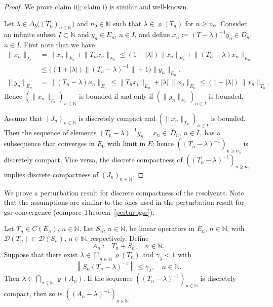 \documentclass[a4paper,reqno]{amsart}
\begin{document}
\begin{proof}
We prove claim ii); claim i) is similar and well-known.

Let $\lambda\in\Delta_b\big((T_n)_{n\in{\mathbb{N}}}\big)$ and $n_0\in{\mathbb{N}}$ such that $\lambda\in\varrho(T_n)$ for $n\geq n_0$. Consider an infinite subset $I\subset{\mathbb{N}}$ and $y_n\in E_n$, $n\in I$, and define  $x_n:=(T-\lambda)^{-1}y_n\in D_n$, $n\in I$.
 First note that  we have
\begin{align*}
\|x_n\|_{T_n}&=\|x_n\|_{E_n}+\|T_nx_n\|_{E_n}\leq (1+|\lambda|)\|x_n\|_{E_n}+\|(T_n-\lambda)x_n\|_{E_n} \\ &\leq \big((1+|\lambda|)\|(T_n-\lambda)^{-1}\|+1\big)\|y_n\|_{E_n},\\[1mm]
\|y_n\|_{E_n}&=\|(T_n-\lambda)x_n\|_{E_n}\leq \|T_nx_i\|_{E_n}+|\lambda|\,\|x_n\|_{E_n}\leq (1+|\lambda|)\,\|x_n\|_{T_n}.
\end{align*}
Hence $(\|x_n\|_{T_n})_{n\in{\mathbb{N}}}$ is bounded if and only if $(\|y_n\|_{E_n})_{n\in I}$ is bounded.

Assume that $(J_n)_{n\in{\mathbb{N}}}$ is discretely compact and $(\|x_n\|_{T_n})_{n\in I}$ is bounded. 
Then the sequence of elements $(T_n-\lambda)^{-1}y_n=x_n\in~D_n$, $n\in I,$ has a subsequence that converges in $E_0$ with limit in $E$; hence  $\left((T_n-\lambda)^{-1}\right)_{n\geq n_0}$ is discretely compact.
Vice versa,  the discrete compactness of $\left((T_n-\lambda)^{-1}\right)_{n\geq n_0}$ implies discrete compactness of $(J_n)_{n\in{\mathbb{N}}}$. 
\end{proof}

We prove a perturbation result for discrete compactness of the resolvents.
Note that the assumptions are similar to the ones used in the perturbation result for gsr-convergence (compare Theorem~\ref{perturbgsr}).

\begin{theorem}
Let $T_n\in C(E_n), \,n\in{\mathbb{N}}$.
Let  $S_n$, $n\in{\mathbb{N}}$, be linear operators in $E_n$, $n\in{\mathbb{N}}$, with ${\mathcal D}(T_n)\subset{\mathcal D}(S_n)$, $n\in{\mathbb{N}}$, respectively.
Define $$A_n:=T_n+S_n, \quad n\in{\mathbb{N}}.$$
Suppose that there exist $\lambda\in\underset{n\in{\mathbb{N}}}{\bigcap}\varrho(T_n)$ 
and $\gamma_\lambda<1$ with
\begin{equation}\label{eqSTbdd2}
\left\|S_n(T_n-\lambda)^{-1}\right\|\leq \gamma_\lambda,\quad n\in{\mathbb{N}}.
\end{equation}
Then $\lambda\in\underset{n\in{\mathbb{N}}}{\bigcap}\varrho(A_n)$.
If the sequence $\left((T_n-\lambda)^{-1}\right)_{n\in{\mathbb{N}}}$ is discretely compact, then so is $\left((A_n-\lambda)^{-1}\right)_{n\in{\mathbb{N}}}$.
\label{perturbdiscrcompres}
\end{theorem}
\end{document}
